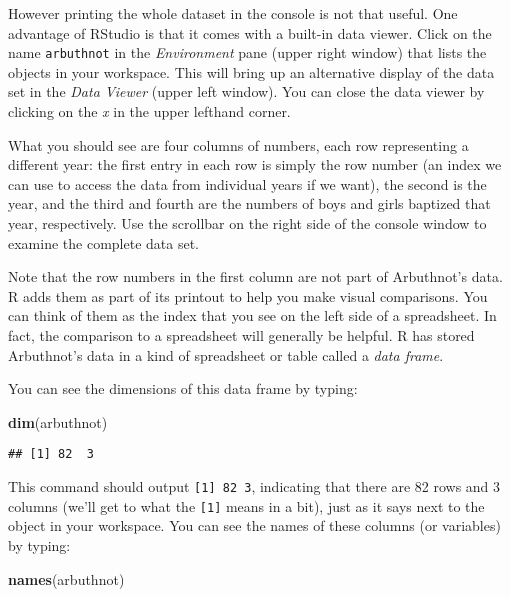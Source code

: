 \documentclass[
]{article}
\newenvironment{Shaded}{\begin{snugshade}}{\end{snugshade}}
\newcommand{\FunctionTok}[1]{\textcolor[rgb]{0.13,0.29,0.53}{\textbf{#1}}}
\newcommand{\NormalTok}[1]{#1}
\begin{document}
However printing the whole dataset in the console is not that useful.
One advantage of RStudio is that it comes with a built-in data viewer.
Click on the name \texttt{arbuthnot} in the \emph{Environment} pane
(upper right window) that lists the objects in your workspace. This will
bring up an alternative display of the data set in the \emph{Data
Viewer} (upper left window). You can close the data viewer by clicking
on the \emph{x} in the upper lefthand corner.

What you should see are four columns of numbers, each row representing a
different year: the first entry in each row is simply the row number (an
index we can use to access the data from individual years if we want),
the second is the year, and the third and fourth are the numbers of boys
and girls baptized that year, respectively. Use the scrollbar on the
right side of the console window to examine the complete data set.

Note that the row numbers in the first column are not part of
Arbuthnot's data. R adds them as part of its printout to help you make
visual comparisons. You can think of them as the index that you see on
the left side of a spreadsheet. In fact, the comparison to a spreadsheet
will generally be helpful. R has stored Arbuthnot's data in a kind of
spreadsheet or table called a \emph{data frame}.

You can see the dimensions of this data frame by typing:

\begin{Shaded}
\begin{Highlighting}[]
\FunctionTok{dim}\NormalTok{(arbuthnot)}
\end{Highlighting}
\end{Shaded}

\begin{verbatim}
## [1] 82  3
\end{verbatim}

This command should output \texttt{{[}1{]}\ 82\ 3}, indicating that
there are 82 rows and 3 columns (we'll get to what the \texttt{{[}1{]}}
means in a bit), just as it says next to the object in your workspace.
You can see the names of these columns (or variables) by typing:

\begin{Shaded}
\begin{Highlighting}[]
\FunctionTok{names}\NormalTok{(arbuthnot)}
\end{Highlighting}
\end{Shaded}
\end{document}
